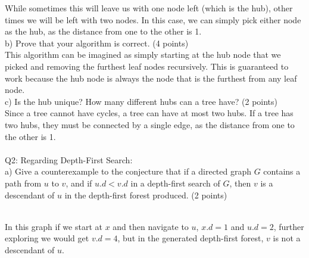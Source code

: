 \documentclass[a4paper,12pt]{article}
\begin{document}
While sometimes this will leave us with one node left (which is the hub), other
times we will be left with two nodes. In this case, we can simply pick either
node as the hub, as the distance from one to the other is 1.
\\
b) Prove that your algorithm is correct. (4 points) \\
This algorithm can be imagined as simply starting at the hub node that we
picked and removing the furthest leaf nodes recursively. This is guaranteed to
work because the hub node is always the node that is the furthest from any leaf
node.
\\
c) Is the hub unique? How many different hubs can a tree have? (2 points) \\
Since a tree cannot have cycles, a tree can have at most two hubs. If a tree
has two hubs, they must be connected by a single edge, as the distance from one
to the other is 1. \\
\\
Q2: Regarding Depth-First Search: \\
a) Give a counterexample to the conjecture that if a directed graph $G$ contains
a path from $u$ to $v$, and if $u.d < v.d$ in a depth-first search of $G$, then
$v$ is a descendant of $u$ in the depth-first forest produced. (2 points) \\
\\
\begin{multicols}{2}
    \columnbreak
\end{multicols}
In this graph if we start at \(x\) and then navigate to \(u\), \(x.d = 1\) and
\(u.d = 2\), further exploring we would get \(v.d = 4\), but in the generated
depth-first forest, \(v\) is not a descendant of \(u\). \\
\end{document}
